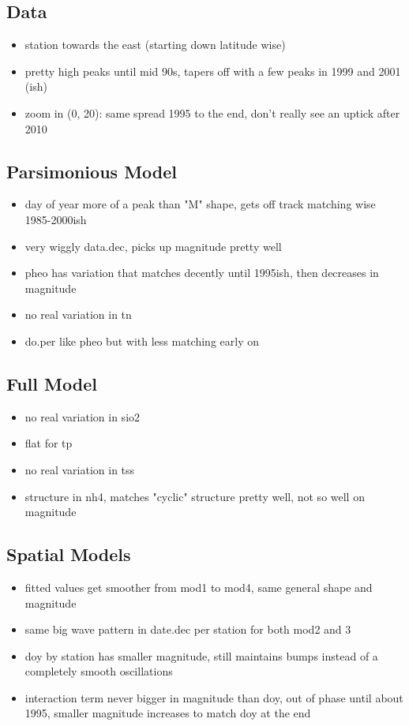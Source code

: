 \documentclass[12pt]{amsart}
\begin{document}
\subsection{Data}
\begin{itemize}
\item station towards the east (starting down latitude wise)
\item pretty high peaks until mid 90s, tapers off with a few peaks in 1999 and 2001 (ish)
\item zoom in (0, 20): same spread 1995 to the end, don't really see an uptick after 2010
\end{itemize}
\subsection{Parsimonious Model}
\begin{itemize}
\item day of year more of a peak than "M" shape, gets off track matching wise 1985-2000ish
\item very wiggly data.dec, picks up magnitude pretty well
\item pheo has variation that matches decently until 1995ish, then decreases in magnitude
\item no real variation in tn
\item do.per like pheo but with less matching early on
\end{itemize}
\subsection{Full Model}
\begin{itemize}
\item no real variation in sio2
\item flat for tp
\item no real variation in tss
\item structure in nh4, matches "cyclic" structure pretty well, not so well on magnitude
\end{itemize}

\subsection{Spatial Models}

\begin{itemize}
\item fitted values get smoother from mod1 to mod4, same general shape and magnitude
\item same big wave pattern in date.dec per station for both mod2 and 3
\item doy by station has smaller magnitude, still maintains bumps instead of a completely smooth oscillations
\item interaction term never bigger in magnitude than doy, out of phase until about 1995, smaller magnitude increases to match doy at the end 
\end{itemize}
\end{document}
